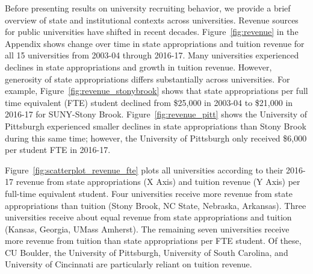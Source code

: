 \documentclass[twoside]{article}
\begin{document}
Before presenting results on university recruiting behavior, we provide a brief overview of state and institutional contexts across universities. Revenue sources for public universities have shifted in recent decades. Figure~\ref{fig:revenue} in the Appendix shows change over time in state appropriations and tuition revenue for all 15 universities from 2003-04 through 2016-17. Many universities experienced declines in state appropriations and growth in tuition revenue. However, generosity of state appropriations differs substantially across universities. For example, Figure~\ref{fig:revenue_stonybrook} shows that state appropriations per full time equivalent (FTE) student declined from \$25,000 in 2003-04 to \$21,000 in 2016-17 for SUNY-Stony Brook. Figure~\ref{fig:revenue_pitt} shows the University of Pittsburgh experienced smaller declines in state appropriations than Stony Brook during this same time; however, the University of Pittsburgh only received \$6,000 per student FTE in 2016-17.

Figure~\ref{fig:scatterplot_revenue_fte} plots all universities according to their 2016-17 revenue from state appropriations (X Axis) and tuition revenue (Y Axis) per full-time equivalent student. Four universities receive more revenue from state appropriations than tuition (Stony Brook, NC State, Nebraska, Arkansas). Three universities receive about equal revenue from state appropriations and tuition (Kansas, Georgia, UMass Amherst). The remaining seven universities receive more revenue from tuition than state appropriations per FTE student. Of these, CU Boulder, the University of Pittsburgh, University of South Carolina, and University of Cincinnati are particularly reliant on tuition revenue.


\end{document}
